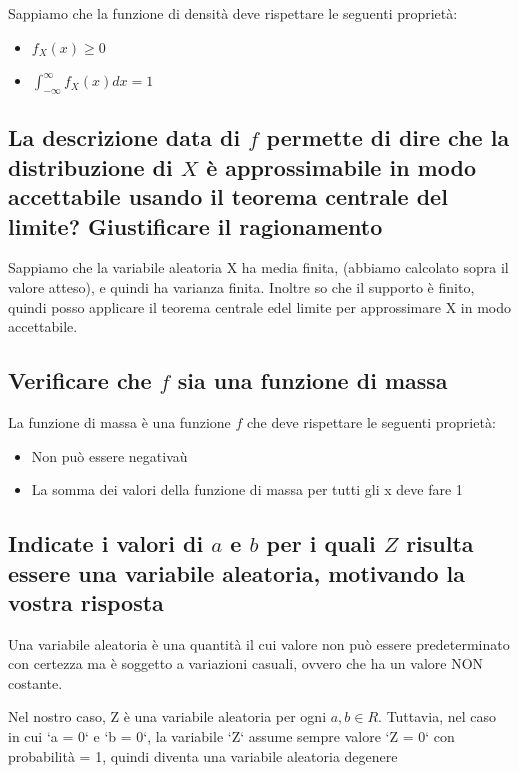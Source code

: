 \documentclass{article}
\begin{document}
Sappiamo che la funzione di densità deve rispettare le seguenti proprietà:

\begin{itemize}
    \item $f_X(x) \geq 0$
    \item $\int_{-\infty}^{\infty}f_X(x) dx = 1$

\end{itemize}

\subsection*{La descrizione data di $f$ permette di dire che la distribuzione di $X$ è approssimabile in modo accettabile usando il teorema centrale del limite? Giustificare il ragionamento}

Sappiamo che la variabile aleatoria X ha media finita, (abbiamo calcolato sopra il valore atteso), e quindi ha varianza finita. Inoltre so che il supporto è finito, quindi posso applicare il teorema centrale edel limite per approssimare X in modo accettabile.

\subsection*{Verificare che $f$ sia una funzione di massa}

La funzione di massa è una funzione $f$ che deve rispettare le seguenti proprietà:

\begin{itemize}
    \item Non può essere negativaù
    \item La somma dei valori della funzione di massa per tutti gli x deve fare 1
\end{itemize}
\subsection*{Indicate i valori di $a$ e $b$ per i quali $Z$ risulta essere una variabile aleatoria, motivando la vostra risposta}

Una variabile aleatoria è una quantità il cui valore non può essere predeterminato con certezza ma è soggetto a variazioni casuali, ovvero che ha un valore NON costante.

Nel nostro caso, Z è una variabile aleatoria per ogni $a, b \in R$. Tuttavia, nel caso in cui `a = 0` e `b = 0`, la variabile `Z` assume sempre valore `Z = 0` con probabilità = 1, quindi diventa una variabile aleatoria degenere
\end{document}

